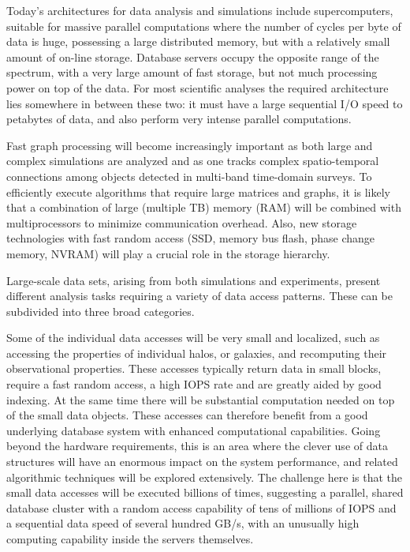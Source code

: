 Today's architectures for data analysis and simulations include
supercomputers, suitable for massive parallel computations where the
number of cycles per byte of data is huge, possessing a large
distributed memory, but with a relatively small amount of on-line
storage. Database servers occupy the opposite range of the spectrum,
with a very large amount of fast storage, but not much processing
power on top of the data. For most scientific analyses the required
architecture lies somewhere in between these two: it must have a large
sequential I/O speed to petabytes of data, and also perform very
intense parallel computations. 

Fast graph processing will become increasingly important as both large
and complex simulations are analyzed and as one tracks complex
spatio-temporal connections among objects detected in multi-band
time-domain surveys. To efficiently execute algorithms that require
large matrices and graphs, it is likely that a combination of large
(multiple TB) memory (RAM) will be combined with multiprocessors to
minimize communication overhead. Also, new storage technologies with
fast random access (SSD, memory bus flash, phase change memory, NVRAM)
will play a crucial role in the storage hierarchy.

Large-scale data sets, arising from both simulations and experiments,
present different analysis tasks requiring a variety of data access
patterns. These can be subdivided into three broad categories.

Some of the individual data accesses will be very small and localized,
such as accessing the properties of individual halos, or galaxies, and
recomputing their observational properties. These accesses typically
return data in small blocks, require a fast random access, a high IOPS
rate and are greatly aided by good indexing. At the same time there
will be substantial computation needed on top of the small data
objects. These accesses can therefore benefit from a good underlying
database system with enhanced computational capabilities. Going beyond
the hardware requirements, this is an area where the clever use of
data structures will have an enormous impact on the system
performance, and related algorithmic techniques will be explored
extensively. The challenge here is that the small data accesses will
be executed billions of times, suggesting a parallel, shared database
cluster with a random access capability of tens of millions of IOPS
and a sequential data speed of several hundred GB/s, with an unusually
high computing capability inside the servers themselves.

